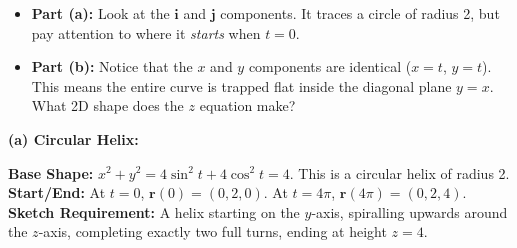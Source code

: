 \begin{hint}
\begin{itemize}[leftmargin=*]
    \item \textbf{Part (a):} Look at the $\mathbf{i}$ and $\mathbf{j}$ components. It traces a circle of radius 2, but pay attention to where it \textit{starts} when $t=0$. 
    \item \textbf{Part (b):} Notice that the $x$ and $y$ components are identical ($x=t$, $y=t$). This means the entire curve is trapped flat inside the diagonal plane $y=x$. What 2D shape does the $z$ equation make?
\end{itemize}
\end{hint}

\begin{solution}
\textbf{(a) Circular Helix:} \\
\begin{minipage}{0.6\textwidth}
\textbf{Base Shape:} $x^2 + y^2 = 4\sin^2 t + 4\cos^2 t = 4$. This is a circular helix of radius 2. \\
\textbf{Start/End:} At $t=0$, $\mathbf{r}(0) = (0, 2, 0)$. At $t=4\pi$, $\mathbf{r}(4\pi) = (0, 2, 4)$. \\
\textbf{Sketch Requirement:} A helix starting on the $y$-axis, spiralling upwards around the $z$-axis, completing exactly two full turns, ending at height $z=4$.
\end{minipage}%
\hfill
\begin{minipage}{0.35\textwidth}
\begin{center}
\end{center}
\end{minipage}


\end{solution}
